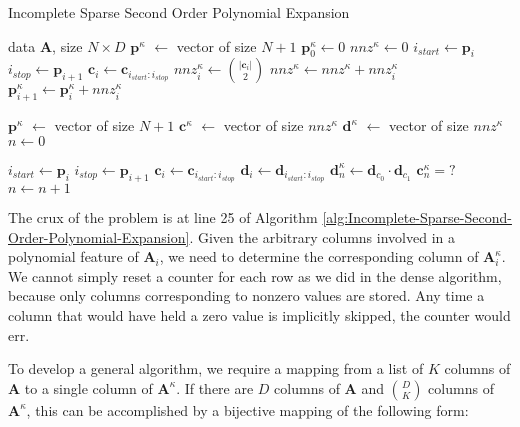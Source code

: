 \documentclass[journal]{journal}
\begin{document}
\begin{algorithm}%
   \caption{Incomplete Sparse Second Order Polynomial Expansion}
   \label{alg:Incomplete-Sparse-Second-Order-Polynomial-Expansion}
\begin{algorithmic}[1]
    data $\bm{A}$, size $N \times D$
   \STATE $\bm{p}^\kappa$ $\gets$ vector of size $N+1$
   \STATE $\bm{p}^\kappa_0 \gets 0$
   \STATE $nnz^\kappa \gets 0$
      \STATE $i_{start} \gets \bm{p}_i$
      \STATE $i_{stop} \gets \bm{p}_{i+1}$
      \STATE $\bm{c}_i \gets \bm{c}_{i_{start}:i_{stop}}$
      \STATE $nnz^\kappa_i \gets \binom{|\bm{c}_i|}{2}$ \label{li:row_nnz_count}
      \STATE $nnz^\kappa \gets nnz^\kappa + nnz^\kappa_i$
      \STATE $\bm{p}^\kappa_{i+1} \gets \bm{p}^\kappa_i + nnz^\kappa_i$
  \ENDFOR
  
  \STATE $\bm{p}^\kappa$ $\gets$ vector of size $N+1$
  \STATE $\bm{c}^\kappa$ $\gets$ vector of size $nnz^\kappa$
  \STATE $\bm{d}^\kappa$ $\gets$ vector of size $nnz^\kappa$
  \STATE $n \gets 0$
  
      \STATE $i_{start} \gets \bm{p}_i$
      \STATE $i_{stop} \gets \bm{p}_{i+1}$
      \STATE $\bm{c}_i \gets \bm{c}_{i_{start}:i_{stop}}$
      \STATE $\bm{d}_i \gets \bm{d}_{i_{start}:i_{stop}}$
              \STATE $\bm{d}^\kappa_{n} \gets \bm{d}_{c_0} \cdot \bm{d}_{c_1}$
              \STATE $\bm{c}^\kappa_{n} = ?$ \label{li:set_ck}
              \STATE $n \gets n + 1$
          \ENDFOR
      \ENDFOR
  \ENDFOR
\end{algorithmic}
\end{algorithm}

The crux of the problem is at line 25 of Algorithm \ref{alg:Incomplete-Sparse-Second-Order-Polynomial-Expansion}.
Given the arbitrary columns involved in a polynomial feature of $\bm{A}_i$, we need to determine the corresponding column of $\bm{A}^\kappa_i$.
We cannot simply reset a counter for each row as we did in the dense algorithm,  because only columns corresponding to nonzero values are stored.
Any time a column that would have held a zero value is implicitly skipped, the counter would err.

To develop a general algorithm, we require a mapping from a list of $K$ columns of $\bm{A}$ to a single column of $\bm{A}^\kappa$.
If there are $D$ columns of $\bm{A}$ and $\binom{D}{K}$ columns of $\bm{A}^\kappa$, this can be accomplished by a bijective mapping of the following form:
\end{document}
